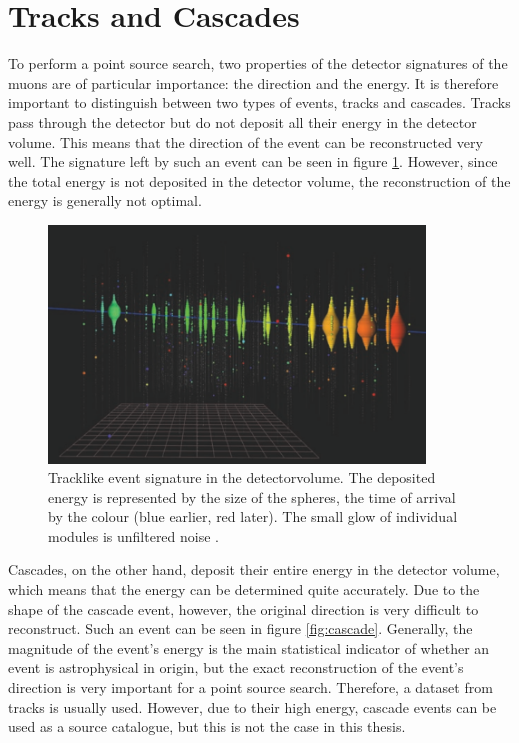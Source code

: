 \section{Tracks and Cascades}

To perform a point source search, two properties of the detector signatures of the muons are of particular importance: the direction and the energy.
It is therefore important to distinguish between two types of events, tracks and cascades.
Tracks pass through the detector but do not deposit all their energy in the detector volume.
This means that the direction of the event can be reconstructed very well.
The signature left by such an event can be seen in figure \ref{fig:track}.
However, since the total energy is not deposited in the detector volume, the reconstruction of the energy is generally not optimal.
\begin{figure}
    \centering
    \includegraphics[width=10cm]{Plots/01_7_icecube/track.png}
    \caption{Tracklike event signature in the detectorvolume. The deposited energy is represented by the size of the spheres, the time of arrival by the colour (blue earlier, red later). The small glow of individual modules is unfiltered noise \cite{spiering}.}
    \label{fig:track}
\end{figure}
Cascades, on the other hand, deposit their entire energy in the detector volume, which means that the energy can be determined quite accurately.
Due to the shape of the cascade event, however, the original direction is very difficult to reconstruct.
Such an event can be seen in figure \ref{fig:cascade}.
Generally, the magnitude of the event's energy is the main statistical indicator of whether an event is astrophysical in origin, but the exact reconstruction of the event's direction is very important for a point source search.
Therefore, a dataset from tracks is usually used.
However, due to their high energy, cascade events can be used as a source catalogue, but this is not the case in this thesis.
